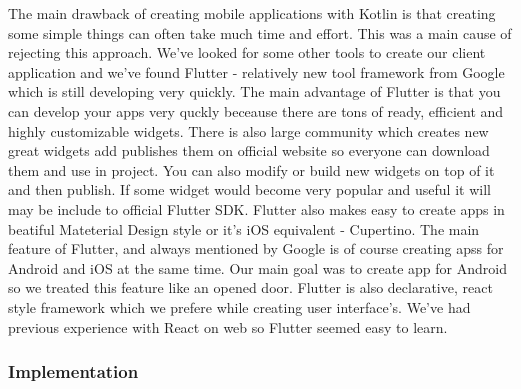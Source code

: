 \documentclass[../Main.tex]{subfiles}
\begin{document}
        The main drawback of creating mobile applications with Kotlin is that creating
        some simple things can often take much time and effort. 
        This was a main cause of rejecting this approach.
        We've looked for some other tools to create our client application and 
        we've found Flutter - relatively new tool framework from Google which 
        is still developing very quickly.
        The main advantage of Flutter is that you can develop your apps very 
        quckly beceause there are tons of ready, efficient and highly customizable 
        widgets. There is also large community which creates new great widgets 
        add publishes them on official website so everyone can download them and use in project.
        You can also modify or build new widgets on top of it and then publish.
        If some widget would become very popular and useful it will may be 
        include to official Flutter SDK. 
        Flutter also makes easy to create apps in beatiful Mateterial Design 
        style or it's iOS equivalent - Cupertino. 
        The main feature of Flutter, and always mentioned by Google is of course 
        creating apss for Android and iOS at the same time. 
        Our main goal was to create app for Android so we treated this feature like 
        an opened door. 
        Flutter is also declarative, react style framework which we prefere while
        creating user interface's. We've had previous experience with React on web
        so Flutter seemed easy to learn. 
        
    \subsubsection{Implementation}
        
        
    

\biblio %
\end{document}
